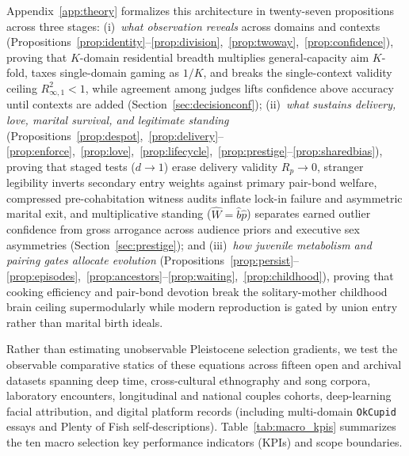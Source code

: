 Appendix~\ref{app:theory} formalizes this architecture in twenty-seven propositions across three stages: (i)~\emph{what observation reveals} across domains and contexts (Propositions~\ref{prop:identity}--\ref{prop:division},~\ref{prop:twoway},~\ref{prop:confidence}), proving that $K$-domain residential breadth multiplies general-capacity aim $K$-fold, taxes single-domain gaming as $1/K$, and breaks the single-context validity ceiling $R^2_{\infty,1}<1$, while agreement among judges lifts confidence above accuracy until contexts are added (Section~\ref{sec:decisionconf}); (ii)~\emph{what sustains delivery, love, marital survival, and legitimate standing} (Propositions~\ref{prop:despot},~\ref{prop:delivery}--\ref{prop:enforce},~\ref{prop:love},~\ref{prop:lifecycle},~\ref{prop:prestige}--\ref{prop:sharedbias}), proving that staged tests ($d\to 1$) erase delivery validity $R_p\to 0$, stranger legibility inverts secondary entry weights against primary pair-bond welfare, compressed pre-cohabitation witness audits inflate lock-in failure and asymmetric marital exit, and multiplicative standing ($\widehat W=\hat b\hat p$) separates earned outlier confidence from gross arrogance across audience priors and executive sex asymmetries (Section~\ref{sec:prestige}); and (iii)~\emph{how juvenile metabolism and pairing gates allocate evolution} (Propositions~\ref{prop:persist}--\ref{prop:episodes},~\ref{prop:ancestors}--\ref{prop:waiting},~\ref{prop:childhood}), proving that cooking efficiency and pair-bond devotion break the solitary-mother childhood brain ceiling supermodularly while modern reproduction is gated by union entry rather than marital birth ideals.

Rather than estimating unobservable Pleistocene selection gradients, we test the observable comparative statics of these equations across fifteen open and archival datasets spanning deep time, cross-cultural ethnography and song corpora, laboratory encounters, longitudinal and national couples cohorts, deep-learning facial attribution, and \PboThreePlatformRecords{} digital platform records (including \PboOkcEssaysN{} multi-domain \texttt{OkCupid} essays and \PboVoiceEssaysN{} Plenty of Fish self-descriptions). Table~\ref{tab:macro_kpis} summarizes the ten macro selection key performance indicators (KPIs) and scope boundaries.

